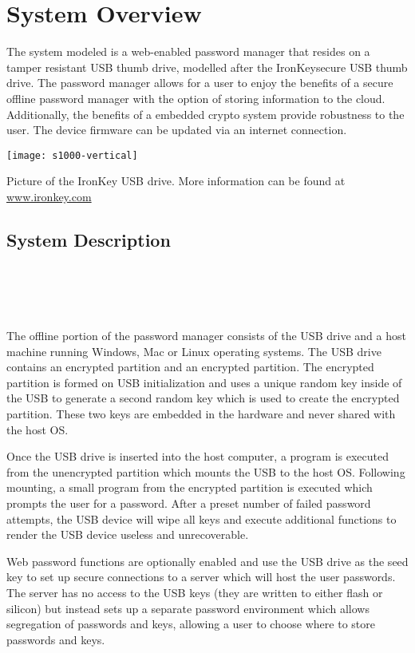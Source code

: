 \chapter{System Overview}
\label{ch:System Overview}
The system modeled is a web-enabled password manager that resides on a tamper resistant USB thumb drive, modelled after the IronKey\texttrademark secure USB thumb drive. The password manager allows for a user to enjoy the benefits of a secure offline password manager with the option of storing information to the cloud.  Additionally, the benefits of a embedded crypto system provide robustness to the user.  The device firmware can be updated via an internet connection.

\begin{marginfigure}%
\centering
  \texttt{[image: s1000-vertical]}
  \caption{Picture of the IronKey USB drive.  More information can be found at \url{www.ironkey.com}}
  \label{fig:ik}
\end{marginfigure}



\section{System Description}
\label{sec:sysdesc}

\\
\\
\\
\\


The offline portion of the password manager consists of the USB drive and a host machine running Windows, Mac or Linux operating systems. The USB drive contains an encrypted partition and an encrypted partition.  The encrypted partition is formed on USB initialization and uses a unique random key inside of the USB to generate a second random key which is used to create the encrypted partition. These two keys are embedded in the hardware and never shared with the host OS.
\par Once the USB drive is inserted into the host computer, a program is executed from the unencrypted partition which mounts the USB to the host OS.  Following mounting, a small program from the encrypted partition is executed which prompts the user for a password. After a preset number of failed password attempts, the USB device will wipe all keys and execute additional functions to render the USB device useless and unrecoverable.
\par Web password functions are optionally enabled and use the USB drive as the seed key to set up secure connections to a server which will host the user passwords.  The server has no access to the USB keys (they are written to either flash or silicon) but instead sets up a separate password environment which allows segregation of passwords and keys, allowing a user to choose where to store passwords and keys.

